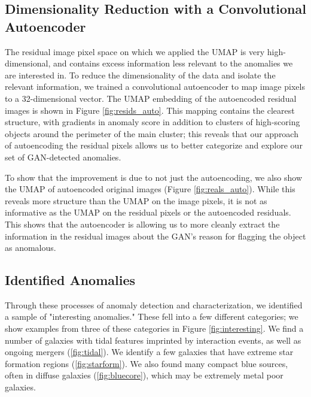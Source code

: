 \documentclass{article}
\begin{document}
\subsection{Dimensionality Reduction with a Convolutional Autoencoder}

The residual image pixel space on which we applied the UMAP is very high-dimensional, and contains excess information less relevant to the anomalies we are interested in.
To reduce the dimensionality of the data and isolate the relevant information, we trained a convolutional autoencoder to map image pixels to a 32-dimensional vector.
The UMAP embedding of the autoencoded residual images is shown in Figure \ref{fig:resids_auto}.
This mapping contains the clearest structure, with gradients in anomaly score in addition to clusters of high-scoring objects around the perimeter of the main cluster; this reveals that our approach of autoencoding the residual pixels allows us to better categorize and explore our set of GAN-detected anomalies.

To show that the improvement is due to not just the autoencoding, we also show the UMAP of autoencoded original images (Figure \ref{fig:reals_auto}).
While this reveals more structure than the UMAP on the image pixels, it is not as informative as the UMAP on the residual pixels or the autoencoded residuals.
This shows that the autoencoder is allowing us to more cleanly extract the information in the residual images about the GAN's reason for flagging the object as anomalous.

\subsection{Identified Anomalies}

Through these processes of anomaly detection and characterization, we identified a sample of "interesting anomalies." These fell into a few different categories; we show examples from three of these categories in Figure \ref{fig:interesting}. We find a number of galaxies with tidal features imprinted by interaction events, as well as ongoing mergers (\ref{fig:tidal}). We identify a few galaxies that have extreme star formation regions (\ref{fig:starform}). We also found many compact blue sources, often in diffuse galaxies (\ref{fig:bluecore}), which may be extremely metal poor galaxies.
\end{document}
